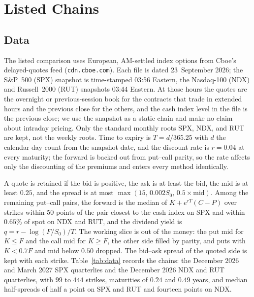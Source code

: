 \documentclass[preprint,12pt,authoryear,times]{elsarticle}
\begin{document}
\section{Listed Chains}
\label{sec:emp}

\subsection{Data}
\label{sec:data}

The listed comparison uses European, AM-settled index options from Cboe's delayed-quotes feed (\texttt{cdn.cboe.com}). Each file is dated 23~September 2026; the S\&P~500 (SPX) snapshot is time-stamped 03:56 Eastern, the Nasdaq-100 (NDX) and Russell~2000 (RUT) snapshots 03:44 Eastern. At those hours the quotes are the overnight or previous-session book for the contracts that trade in extended hours and the previous close for the others, and the cash index level in the file is the previous close; we use the snapshot as a static chain and make no claim about intraday pricing. Only the standard monthly roots SPX, NDX, and RUT are kept, not the weekly roots. Time to expiry is \(T=d/365.25\) with \(d\) the calendar-day count from the snapshot date, and the discount rate is \(r=0.04\) at every maturity; the forward is backed out from put--call parity, so the rate affects only the discounting of the premiums and enters every method identically.

A quote is retained if the bid is positive, the ask is at least the bid, the mid is at least \(0.25\), and the spread is at most \(\max(15,\,0.002S_0,\,0.5\times\mathrm{mid})\). Among the remaining put--call pairs, the forward is the median of \(K+e^{rT}(C-P)\) over strikes within \(50\) points of the pair closest to the cash index on SPX and within \(0.65\%\) of spot on NDX and RUT, and the dividend yield is \(q=r-\log(F/S_0)/T\). The working slice is out of the money: the put mid for \(K\le F\) and the call mid for \(K\ge F\), the other side filled by parity, and puts with \(K<0.7F\) and mid below \(0.50\) dropped. The bid--ask spread of the quoted side is kept with each strike. Table~\ref{tab:data} records the chains: the December 2026 and March 2027 SPX quarterlies and the December 2026 NDX and RUT quarterlies, with \(99\) to \(444\) strikes, maturities of \(0.24\) and \(0.49\) years, and median half-spreads of half a point on SPX and RUT and fourteen points on NDX.
\end{document}
